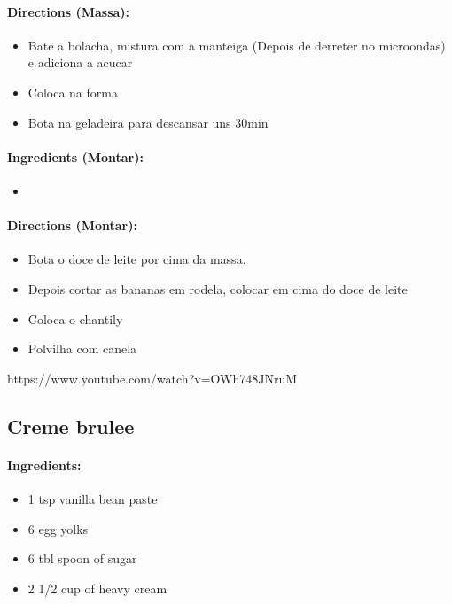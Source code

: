\documentclass{article}
\begin{document}
\paragraph{Directions (Massa):}
\begin{itemize}
	\item Bate a bolacha, mistura com a manteiga (Depois de derreter no microondas) e adiciona a acucar
	\item Coloca na forma
	\item Bota na geladeira para descansar uns 30min
\end{itemize}

\paragraph{Ingredients (Montar):}
\begin{itemize}
	\item
\end{itemize}

\paragraph{Directions (Montar):}
\begin{itemize}
	\item Bota o doce de leite por cima da massa.
	\item Depois cortar as bananas em rodela, colocar em cima do doce de leite
	\item Coloca o chantily
	\item Polvilha com canela
\end{itemize}




https://www.youtube.com/watch?v=OWh748JNruM

\subsection{Creme brulee}

\paragraph{Ingredients:}

\begin{itemize}
\item 1 tsp vanilla bean paste
\item 6 egg yolks
\item 6 tbl spoon of sugar
\item 2 1/2 cup of heavy cream
\end{itemize}
\end{document}
